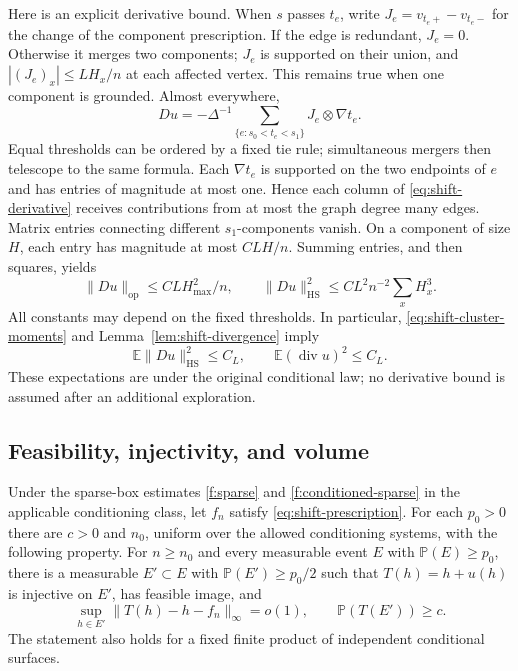 Here is an explicit derivative bound. When $s$ passes $t_e$, write
$J_e=v_{t_e+}-v_{t_e-}$ for the change of the component prescription.
If the edge is redundant, $J_e=0$. Otherwise it merges two components;
$J_e$ is supported on their union, and
$|(J_e)_x|\leq L H_x/n$ at each affected vertex. This remains true when
one component is grounded. Almost everywhere,
\begin{equation}\label{eq:shift-derivative}
 Du=-\Delta^{-1}
       \sum_{\{e:s_0<t_e<s_1\}} J_e\otimes\nabla t_e.
\end{equation}
Equal thresholds can be ordered by a fixed tie rule; simultaneous mergers
then telescope to the same formula. Each $\nabla t_e$ is supported on
the two endpoints of $e$ and has entries of magnitude at most one.
Hence each column of \eqref{eq:shift-derivative} receives contributions
from at most the graph degree many edges. Matrix entries connecting
different $s_1$-components vanish. On a component of size $H$,
each entry has magnitude at most $C L H/n$. Summing entries, and then
squares, yields
\begin{equation}\label{eq:shift-matrix-bounds}
 \|Du\|_{\mathrm{op}}\leq C L H_{\max}^2/n,\qquad
 \|Du\|_{\mathrm{HS}}^2\leq C L^2n^{-2}\sum_x H_x^3.
\end{equation}
All constants may depend on the fixed thresholds. In particular,
\eqref{eq:shift-cluster-moments} and
Lemma~\ref{lem:shift-divergence} imply
\begin{equation}\label{eq:shift-mean-bounds}
 \mathbb E\|Du\|_{\mathrm{HS}}^2\leq C_L,\qquad
 \mathbb E(\operatorname{div}u)^2\leq C_L.
\end{equation}
These expectations are under the original conditional law; no derivative
bound is assumed after an additional exploration.

\subsection{Feasibility, injectivity, and volume}

\begin{proposition}\label{g:shifts}
Under the sparse-box estimates \ref{f:sparse} and
\ref{f:conditioned-sparse} in the applicable conditioning class, let $f_n$ satisfy
\eqref{eq:shift-prescription}. For each $p_0>0$ there are $c>0$ and $n_0$,
uniform over the allowed conditioning systems, with the following property.
For $n\geq n_0$ and every measurable event $E$ with $\mathbb P(E)\geq p_0$,
there is a measurable $E'\subset E$ with $\mathbb P(E')\geq p_0/2$ such that
$T(h)=h+u(h)$ is injective on $E'$, has feasible image, and
\[
 \sup_{h\in E'}\|T(h)-h-f_n\|_\infty=o(1),\qquad
 \mathbb P(T(E'))\geq c.
\]
The statement also holds for a fixed finite product of independent
conditional surfaces.
\end{proposition}

